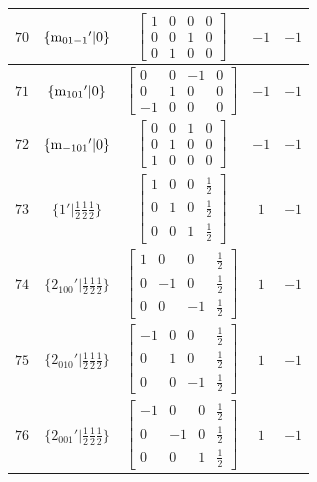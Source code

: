 \documentclass[fleqn,8pt]{jsarticle}
\begin{document}
\begin{longtable}{ccccc}
$ 70 $ & $ \{{\rm m}_{01-1}{}'|0\} $ & $ \begin{bmatrix} 1 & 0 & 0 & 0 \\ 0 & 0 & 1 & 0 \\ 0 & 1 & 0 & 0 \end{bmatrix} $ & $ -1 $ & $ -1 $ \\ \hline
$ 71 $ & $ \{{\rm m}_{101}{}'|0\} $ & $ \begin{bmatrix} 0 & 0 & -1 & 0 \\ 0 & 1 & 0 & 0 \\ -1 & 0 & 0 & 0 \end{bmatrix} $ & $ -1 $ & $ -1 $ \\ \hline
$ 72 $ & $ \{{\rm m}_{-101}{}'|0\} $ & $ \begin{bmatrix} 0 & 0 & 1 & 0 \\ 0 & 1 & 0 & 0 \\ 1 & 0 & 0 & 0 \end{bmatrix} $ & $ -1 $ & $ -1 $ \\ \hline
$ 73 $ & $ \{1{}'|\frac{1}{2} \frac{1}{2} \frac{1}{2}\} $ & $ \begin{bmatrix} 1 & 0 & 0 & \frac{1}{2} \\ 0 & 1 & 0 & \frac{1}{2} \\ 0 & 0 & 1 & \frac{1}{2} \end{bmatrix} $ & $ 1 $ & $ -1 $ \\ \hline
$ 74 $ & $ \{2{}_{100}{}'|\frac{1}{2} \frac{1}{2} \frac{1}{2}\} $ & $ \begin{bmatrix} 1 & 0 & 0 & \frac{1}{2} \\ 0 & -1 & 0 & \frac{1}{2} \\ 0 & 0 & -1 & \frac{1}{2} \end{bmatrix} $ & $ 1 $ & $ -1 $ \\ \hline
$ 75 $ & $ \{2{}_{010}{}'|\frac{1}{2} \frac{1}{2} \frac{1}{2}\} $ & $ \begin{bmatrix} -1 & 0 & 0 & \frac{1}{2} \\ 0 & 1 & 0 & \frac{1}{2} \\ 0 & 0 & -1 & \frac{1}{2} \end{bmatrix} $ & $ 1 $ & $ -1 $ \\ \hline
$ 76 $ & $ \{2{}_{001}{}'|\frac{1}{2} \frac{1}{2} \frac{1}{2}\} $ & $ \begin{bmatrix} -1 & 0 & 0 & \frac{1}{2} \\ 0 & -1 & 0 & \frac{1}{2} \\ 0 & 0 & 1 & \frac{1}{2} \end{bmatrix} $ & $ 1 $ & $ -1 $ \\ \hline

\end{longtable}
\end{document}
